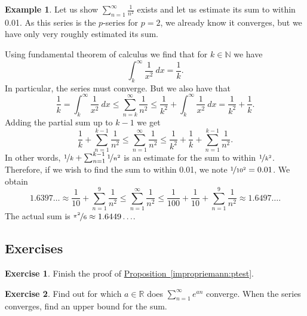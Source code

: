 \documentclass[12pt]{book}
\newcommand{\R}{{\mathbb{R}}}
\newcommand{\N}{{\mathbb{N}}}
\theoremstyle{plain}
\theoremstyle{remark}
\theoremstyle{definition}
\theoremstyle{exercise}
\newtheorem{exercise}{Exercise}[section]
\theoremstyle{example}
\newtheorem{example}[thm]{Example}
\newcommand{\propref}[1]{\hyperref[#1]{Proposition~\ref*{#1}}}
\begin{document}
\begin{example}
Let us show $\sum_{n=1}^\infty \frac{1}{n^2}$ exists and let us
estimate its sum to within 0.01.  As this series is the $p$-series for
$p=2$, we already know it converges, but we have only very roughly
estimated its sum.

Using fundamental theorem of calculus we find that for $k \in \N$
we have
\begin{equation*}
\int_{k}^\infty \frac{1}{x^2}~dx = \frac{1}{k} .
\end{equation*}
In particular, the series must converge.  But we also have that
\begin{equation*}
\frac{1}{k} = \int_k^\infty \frac{1}{x^2}~dx
\leq
\sum_{n=k}^\infty \frac{1}{n^2}
\leq
\frac{1}{k^2}
+
\int_k^\infty \frac{1}{x^2}~dx
=
\frac{1}{k^2}
+
\frac{1}{k} .
\end{equation*}
Adding the partial sum up to $k-1$ we get
\begin{equation*}
\frac{1}{k} + \sum_{n=1}^{k-1} \frac{1}{n^2}
\leq
\sum_{n=1}^\infty \frac{1}{n^2}
\leq
\frac{1}{k^2}
+
\frac{1}{k} + \sum_{n=1}^{k-1} \frac{1}{n^2} .
\end{equation*}
In other words,
$\nicefrac{1}{k} + \sum_{n=1}^{k-1} \nicefrac{1}{n^2}$ is an estimate for
the sum to within $\nicefrac{1}{k^2}$.  Therefore, if we wish to
find the sum to within 0.01, we note $\nicefrac{1}{{10}^2} = 0.01$.  We
obtain
\begin{equation*}
1.6397\ldots
\approx
\frac{1}{10} + \sum_{n=1}^{9} \frac{1}{n^2}
\leq
\sum_{n=1}^\infty \frac{1}{n^2}
\leq
\frac{1}{100}
+
\frac{1}{10} + \sum_{n=1}^{9} \frac{1}{n^2}
\approx
1.6497\ldots .
\end{equation*}
The actual sum is $\nicefrac{\pi^2}{6} \approx 1.6449\ldots$. 
\end{example}

\subsection{Exercises}

\begin{exercise}
Finish the proof of \propref{impropriemann:ptest}.
\end{exercise}

\begin{exercise}
Find out for which $a \in \R$ does $\sum\limits_{n=1}^\infty e^{an}$ converge.
When the series converges, find an upper bound for the sum.
\end{exercise}
\end{document}
